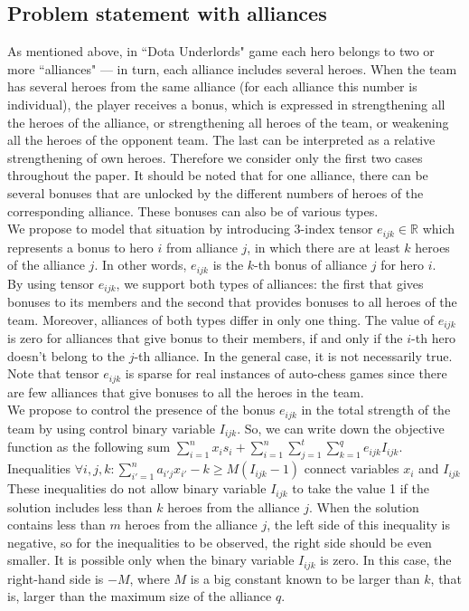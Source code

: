 \documentclass[smallextended]{svjour3}       %
\begin{document}
\subsection{Problem statement with alliances}
As mentioned above, in ``Dota Underlords" game each hero belongs to two or more ``alliances" --- in turn, each alliance includes several heroes. When the team has several heroes from the same alliance (for each alliance this number is individual), the player receives a bonus, which is expressed in strengthening all the heroes of the alliance, or strengthening all heroes of the team, or weakening all the heroes of the opponent team. The last can be interpreted as a relative strengthening of own heroes. Therefore we consider only the first two cases throughout the paper. It should be noted that for one alliance, there can be several bonuses that are unlocked by the different numbers of heroes of the corresponding alliance. These bonuses can also be of various types.\\
We propose to model that situation by introducing 3-index tensor $ e_{ijk} \in \mathbb{R} $ which represents a bonus to hero $i$ from alliance $j$, in which there are at least $k$ heroes of the alliance $j$. In other words, $ e_{ijk} $ is the $k$-th bonus of alliance $ j$ for hero $i$.\\
By using tensor $e_{ijk} $, we support both types of alliances: the first that gives bonuses to its members and the second that provides bonuses to all  heroes of the team. Moreover, alliances of both types differ in only one thing.  The value of $e_{ijk} $ is zero for alliances that give bonus to their members, if and only if the $i$-th hero doesn't belong to the $j$-th alliance. In the general case, it is not necessarily true. Note that tensor $ e_{ijk} $ is sparse for real instances of auto-chess games since there are few alliances that give bonuses to all the heroes in the team.
\\We propose to control the presence of the  bonus $ e_{ijk} $ in the total strength of the team by using control binary variable $ I_{ijk} $.
So, we can write down the objective function as the following sum $ \sum_{i = 1}^{n} x_i s_i + \sum_{i=1}^{n} \sum_{j=1}^{t}  \sum_{k=1}^{q} e_{ijk} I_{ijk} $.
Inequalities $\forall{i,j,k} :  \sum_{i'=1}^{n} a_{i'j} x_{i'} -  k\ge M( I_{ijk} - 1)$ connect variables $ x_{i} $ and $ I_{ijk} $ 
\\These inequalities do not allow binary variable $ I_{ijk} $ to take the value 1 if the solution includes less than $k$ heroes from the alliance $j$. When the solution contains less than $m$ heroes from the alliance $j$, the left side of this inequality is negative, so for the inequalities to be observed, the right side should be even smaller. It is possible only when the binary variable $ I_{ijk} $ is zero. In this case, the right-hand side is $-M $, where $M$ is a big constant known to be larger than $k$, that is, larger than the maximum size of the alliance $q$.\\
\end{document}
